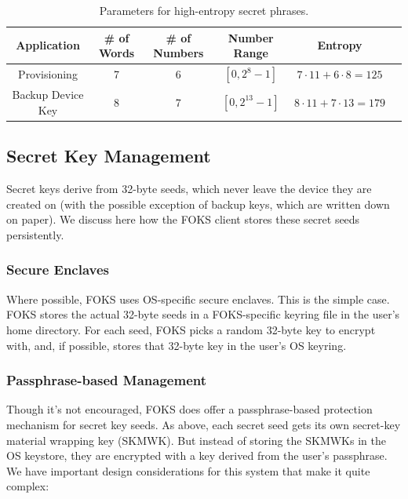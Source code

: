 \begin{table}[ht]
  \centering
  \begin{tabular}{|c|c|c|c|c|c|}
    \hline Application & \# of Words & \# of Numbers & Number Range & Entropy \\
    \hline
    \hline
    Provisioning & 7 & 6 & $[0,2^8-1]$ & $7\cdot 11 + 6\cdot 8 = 125$ \\
    \hline
    Backup Device Key & 8 & 7 & $[0,2^{13}-1]$ & $8\cdot 11 + 7\cdot 13 = 179$ \\
    \hline
  \end{tabular}
  \caption{Parameters for high-entropy secret phrases.}
  \label{tab:hesp-params}
\end{table}


\subsection{Secret Key Management}
\label{sec:skm}

Secret keys derive from 32-byte seeds, which never leave the device they are created
on (with the possible exception of backup keys, which are written down on paper).
We discuss here how the FOKS client stores these secret seeds persistently. 

\subsubsection{Secure Enclaves}

Where possible, FOKS uses OS-specific secure enclaves. This is the simple case.
FOKS stores the actual 32-byte seeds in a FOKS-specific keyring file in the user's 
home directory. For each seed, FOKS picks a random 32-byte key to encrypt with, and,
if possible, stores that 32-byte key in the user's OS keyring. 

\subsubsection{Passphrase-based Management}

Though it's not encouraged, FOKS does offer a passphrase-based protection mechanism
for secret key seeds. As above, each secret seed gets its own secret-key 
material wrapping key (SKMWK). But instead of storing the SKMWKs in the OS keystore,
they are encrypted with a key derived from the user's passphrase. We have important 
design considerations for this system that make it quite complex:

